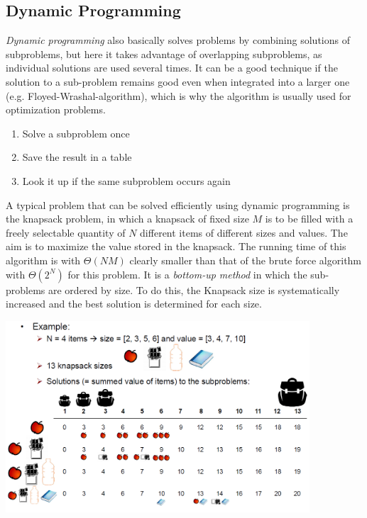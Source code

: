 \subsection{Dynamic Programming}

\emph{Dynamic programming} also basically solves problems by combining solutions of subproblems, but here it takes advantage of overlapping subproblems, as individual solutions are used several times. It can be a good technique if the solution to a sub-problem remains good even when integrated into a larger one (e.g. Floyed-Wrashal-algorithm), which is why the algorithm is usually used for optimization problems.

\begin{enumerate}
    \item Solve a subproblem once
    \item Save the result in a table
    \item Look it up if the same subproblem occurs again
\end{enumerate}

A typical problem that can be solved efficiently using dynamic programming is the knapsack problem, in which a knapsack of fixed size $M$ is to be filled with a freely selectable quantity of $N$ different items of different sizes and values. The aim is to maximize the value stored in the knapsack. The running time of this algorithm is with $\Theta(NM)$ clearly smaller than that of the brute force algorithm with $\Theta(2^N)$ for this problem. It is a \emph{bottom-up method} in which the sub-problems are ordered by size. To do this, the Knapsack size is systematically increased and the best solution is determined for each size.

\begin{center}\includegraphics[width=0.85\textwidth]{img/algorithms/DynamicProgrammingKnapsack.png}\end{center}

